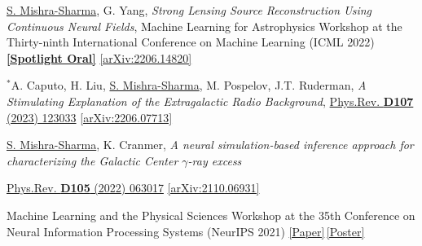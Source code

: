 \documentclass[letterpaper,11pt]{article}
\newenvironment{packed_itemize}{
\begin{itemize}[label=\raisebox{0.25ex}{\tiny$\bullet$}]
  \setlength{\itemsep}{4.0pt}
  \setlength{\parskip}{0pt}
  \setlength{\parsep}{0pt}}{\end{itemize}
}
\newenvironment{packed_enumerate}[1][]{
\begin{etaremune}[#1]
  \setlength{\itemsep}{4.0pt}
  \setlength{\parskip}{0pt}
  \setlength{\parsep}{0pt}}{\end{etaremune}
}
\begin{document}
\begin{packed_enumerate}[start=56]
  \item \underline{S. Mishra-Sharma}, G. Yang, \emph{Strong Lensing Source Reconstruction Using Continuous Neural Fields}, {Machine Learning for Astrophysics Workshop at the Thirty-ninth International Conference on Machine Learning (ICML 2022)} \href{https://ml4astro.github.io/icml2022/}{\textbf{[Spotlight Oral]}} \href{https://arxiv.org/abs/2206.14820}{[arXiv:2206.14820]}
   
  \item $^*$A. Caputo, H. Liu, \underline{S. Mishra-Sharma}, M. Pospelov, J.T. Ruderman, \emph{A Stimulating Explanation of the Extragalactic Radio Background}, \href{https://journals.aps.org/prd/abstract/10.1103/PhysRevD.107.123033}{Phys.Rev. \textbf{D107} (2023) 123033} \href{https://arxiv.org/abs/2206.07713}{[arXiv:2206.07713]}
  \item  \underline{S. Mishra-Sharma}, K. Cranmer, \emph{A neural simulation-based inference approach for characterizing the Galactic Center $\gamma$-ray excess}
    \begin{packed_itemize}
      \item {\href{https://journals.aps.org/prd/abstract/10.1103/PhysRevD.105.063017}{Phys.Rev. \textbf{D105} (2022) 063017} \href{https://arxiv.org/abs/2110.06931}{[arXiv:2110.06931]}}
      \item {Machine Learning and the Physical Sciences Workshop at the 35th Conference on Neural Information Processing Systems (NeurIPS 2021) \href{https://ml4physicalsciences.github.io/2020/files/NeurIPS_ML4PS_2020_20.pdf}{[Paper]}\,\href{https://ml4physicalsciences.github.io/2020/files/NeurIPS_ML4PS_2020_20_poster.pdf}{[Poster]}}
    \end{packed_itemize}

\end{packed_enumerate}
\end{document}

